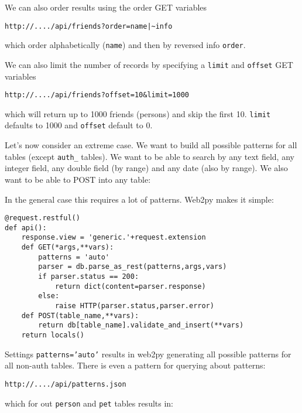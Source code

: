 \documentclass[justified,sixbynine,notoc]{tufte-book}
\def\ft{\small\tt}
\begin{document}
\begin{fullwidth}
We can also order results using the order GET variables

\begin{lstlisting}[keywords={}]
http://..../api/friends?order=name|~info
\end{lstlisting}
which order alphabetically ({\ft name}) and then by reversed info {\ft order}.

We can also limit the number of records by specifying a {\ft limit} and {\ft offset} GET variables

\begin{lstlisting}[keywords={}]
http://..../api/friends?offset=10&limit=1000
\end{lstlisting}
which will return up to 1000 friends (persons) and skip the first 10. {\ft limit} defaults to 1000 and {\ft offset} default to 0.

Let's now consider an extreme case. We want to build all possible patterns for all tables (except {\ft auth\_} tables). We want to be able to search by any text field, any integer field, any double field (by range) and any date (also by range). We also want to be able to POST into any table:

In the general case this requires a lot of patterns. Web2py makes it simple:

\begin{lstlisting}
@request.restful()
def api():
    response.view = 'generic.'+request.extension
    def GET(*args,**vars):
        patterns = 'auto'
        parser = db.parse_as_rest(patterns,args,vars)
        if parser.status == 200:
            return dict(content=parser.response)
        else:
            raise HTTP(parser.status,parser.error)
    def POST(table_name,**vars):
        return db[table_name].validate_and_insert(**vars)
    return locals()
\end{lstlisting}

Settings {\ft patterns='auto'} results in web2py generating all possible patterns for all non-auth tables.
There is even a pattern for querying about patterns:

\begin{lstlisting}[keywords={}]
http://..../api/patterns.json
\end{lstlisting}
\noindent which for out {\ft person} and {\ft pet} tables results in:


\end{fullwidth}
\end{document}
